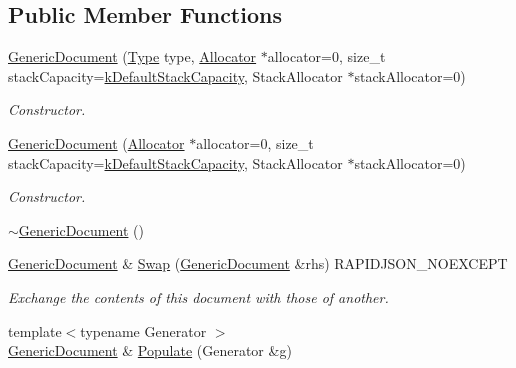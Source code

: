 \subsection*{Public Member Functions}
\begin{DoxyCompactItemize}
\item 
\mbox{\hyperlink{classrapidjson_1_1_generic_document_aa52c3016961f25ecd989d82839bce4e5}{Generic\+Document}} (\mbox{\hyperlink{namespacerapidjson_ae79a4751c1c460ff0de5ecc07874f3e4}{Type}} type, \mbox{\hyperlink{classrapidjson_1_1_allocator}{Allocator}} $\ast$allocator=0, size\+\_\+t stack\+Capacity=\mbox{\hyperlink{classrapidjson_1_1_generic_document_a557c989fcf60e58100c189555c47aa5a}{k\+Default\+Stack\+Capacity}}, Stack\+Allocator $\ast$stack\+Allocator=0)
\begin{DoxyCompactList}\small\item\em Constructor. \end{DoxyCompactList}\item 
\mbox{\hyperlink{classrapidjson_1_1_generic_document_a82b27e7b228eb46a23f99720063ab4fb}{Generic\+Document}} (\mbox{\hyperlink{classrapidjson_1_1_allocator}{Allocator}} $\ast$allocator=0, size\+\_\+t stack\+Capacity=\mbox{\hyperlink{classrapidjson_1_1_generic_document_a557c989fcf60e58100c189555c47aa5a}{k\+Default\+Stack\+Capacity}}, Stack\+Allocator $\ast$stack\+Allocator=0)
\begin{DoxyCompactList}\small\item\em Constructor. \end{DoxyCompactList}\item 
\mbox{\hyperlink{classrapidjson_1_1_generic_document_a09b1953e1610e182ddcf050b346957b2}{$\sim$\+Generic\+Document}} ()
\item 
\mbox{\hyperlink{classrapidjson_1_1_generic_document}{Generic\+Document}} \& \mbox{\hyperlink{classrapidjson_1_1_generic_document_abf1cbab989b856f9d260787b2575750b}{Swap}} (\mbox{\hyperlink{classrapidjson_1_1_generic_document}{Generic\+Document}} \&rhs) R\+A\+P\+I\+D\+J\+S\+O\+N\+\_\+\+N\+O\+E\+X\+C\+E\+PT
\begin{DoxyCompactList}\small\item\em Exchange the contents of this document with those of another. \end{DoxyCompactList}\item 
{\footnotesize template$<$typename Generator $>$ }\\\mbox{\hyperlink{classrapidjson_1_1_generic_document}{Generic\+Document}} \& \mbox{\hyperlink{classrapidjson_1_1_generic_document_a63e18887979da500ece6f0bd10d29b64}{Populate}} (Generator \&g)

\end{DoxyCompactItemize}
